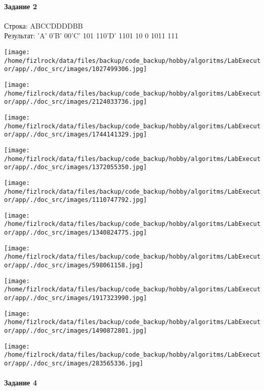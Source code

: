 \documentclass[a4paper, 12pt]{article}
\begin{document}
\paragraph{Задание 2}

Строка: 
ABCCDDDDBB\\
Результат: 'A' 0'B' 00'C' 101 110'D' 1101 10 0 1011 111

\texttt{[image: /home/fizlrock/data/files/backup/code\_backup/hobby/algoritms/LabExecutor/app/./doc\_src/images/1027499306.jpg]}

\texttt{[image: /home/fizlrock/data/files/backup/code\_backup/hobby/algoritms/LabExecutor/app/./doc\_src/images/2124033736.jpg]}

\texttt{[image: /home/fizlrock/data/files/backup/code\_backup/hobby/algoritms/LabExecutor/app/./doc\_src/images/1744141329.jpg]}

\texttt{[image: /home/fizlrock/data/files/backup/code\_backup/hobby/algoritms/LabExecutor/app/./doc\_src/images/1372055350.jpg]}

\texttt{[image: /home/fizlrock/data/files/backup/code\_backup/hobby/algoritms/LabExecutor/app/./doc\_src/images/1110747792.jpg]}

\texttt{[image: /home/fizlrock/data/files/backup/code\_backup/hobby/algoritms/LabExecutor/app/./doc\_src/images/1340824775.jpg]}

\texttt{[image: /home/fizlrock/data/files/backup/code\_backup/hobby/algoritms/LabExecutor/app/./doc\_src/images/598061158.jpg]}

\texttt{[image: /home/fizlrock/data/files/backup/code\_backup/hobby/algoritms/LabExecutor/app/./doc\_src/images/1917323990.jpg]}

\texttt{[image: /home/fizlrock/data/files/backup/code\_backup/hobby/algoritms/LabExecutor/app/./doc\_src/images/1490872801.jpg]}

\texttt{[image: /home/fizlrock/data/files/backup/code\_backup/hobby/algoritms/LabExecutor/app/./doc\_src/images/283565336.jpg]}
\pagebreak
\paragraph{Задание 4}
\end{document}
